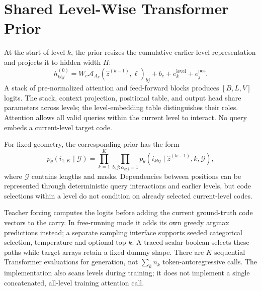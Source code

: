 \documentclass[11pt,a4paper]{article}
\begin{document}
\section{Shared Level-Wise Transformer Prior}
\label{sec:prior}
At the start of level \(k\), the prior resizes the cumulative earlier-level
representation and projects it to hidden width \(H\):
\begin{equation}
 h^{(0)}_{kbj}=W_c\mathcal{A}_{A_k}(\widehat z^{(k-1)},\ell)_{bj}
             +b_c+e^{\mathrm{level}}_k+e^{\mathrm{pos}}_j.
\end{equation}
A stack of pre-normalized attention and feed-forward blocks produces
\([B,L,V]\) logits. The stack, context projection, positional table, and output
head share parameters across levels; the level-embedding table distinguishes
their roles. Attention allows all valid queries within the current level to
interact. No query embeds a current-level target code.

For fixed geometry, the corresponding prior has the form
\begin{equation}
 p_\theta(i_{1:K}\mid\mathcal{G})=
 \prod_{k=1}^{K}\prod_{b,j:\alpha_{kbj}=1}
 p_\theta(i_{kbj}\mid\widehat z^{(k-1)},k,\mathcal{G}),
 \label{eq:factor}
\end{equation}
where \(\mathcal{G}\) contains lengths and masks. Dependencies between positions
can be represented through deterministic query interactions and earlier
levels, but code selections within a level do not condition on already
selected current-level codes.

Teacher forcing computes the logits before adding the current ground-truth
code vectors to the carry. In free-running mode it adds its own greedy argmax
predictions instead; a separate sampling interface supports seeded categorical
selection, temperature and optional top-$k$. A traced scalar boolean selects these paths while target
arrays retain a fixed dummy shape. There are \(K\) sequential Transformer
evaluations for generation, not \(\sum_k n_k\) token-autoregressive calls.
The implementation also scans levels during training; it does not implement a
single concatenated, all-level training attention call.
\end{document}
